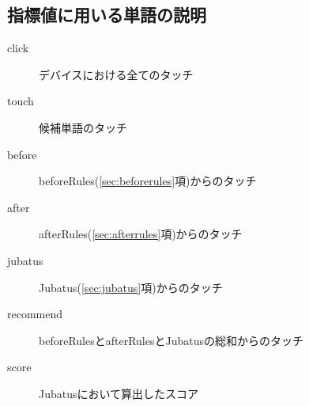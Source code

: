 \subsection{指標値に用いる単語の説明}
\begin{description}
  \item[click] デバイスにおける全てのタッチ
  \item[touch] 候補単語のタッチ
  \item[before] beforeRules(\ref{sec:beforerules}項)からのタッチ
  \item[after] afterRules(\ref{sec:afterrules}項)からのタッチ
  \item[jubatus] Jubatus(\ref{sec:jubatus}項)からのタッチ
  \item[recommend] beforeRulesとafterRulesとJubatusの総和からのタッチ
  \item[score] Jubatusにおいて算出したスコア
\end{description}
